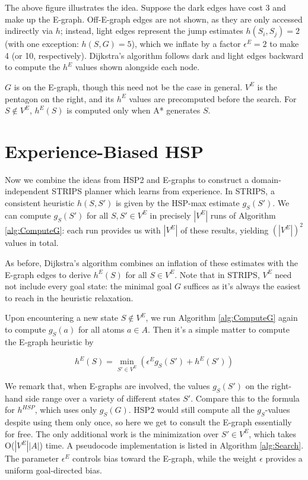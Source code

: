 \documentclass[letterpaper]{article}
\begin{document}
The above figure illustrates the idea. Suppose the dark edges have cost 3 and make up the E-graph. Off-E-graph edges are not shown, as they are only accessed indirectly via $h$; instead, light edges represent the jump estimates $h(S_i,S_j) = 2$ (with one exception: $h(S,G) = 5$), which we inflate by a factor $\epsilon^E=2$ to make 4 (or 10, respectively). Dijkstra's algorithm follows dark and light edges backward to compute the $h^E$ values shown alongside each node.

$G$ is on the E-graph, though this need not be the case in general. $V^E$ is the pentagon on the right, and its $h^E$ values are precomputed before the search. For $S\notin V^E$, $h^E(S)$ is computed only when A* generates $S$.

\section{Experience-Biased HSP}

Now we combine the ideas from HSP2 and E-graphs to construct a domain-independent STRIPS planner which learns from experience. In STRIPS, a consistent heuristic $h(S,S')$ is given by the HSP-max estimate $g_S(S')$. We can compute $g_S(S')$ for all $S,S'\in V^E$ in precisely $|V^E|$ runs of Algorithm \ref{alg:ComputeG}: each run provides us with $|V^E|$ of these results, yielding $(|V^E|)^2$ values in total.

As before, Dijkstra's algorithm combines an inflation of these estimates with the E-graph edges to derive $h^E(S)$ for all $S\in V^E$. Note that in STRIPS, $V^E$ need not include every goal state: the minimal goal $G$ suffices as it's always the easiest to reach in the heuristic relaxation.

Upon encountering a new state $S\notin V^E$, we run Algorithm \ref{alg:ComputeG} again to compute $g_S(a)$ for all atoms $a\in A$. Then it's a simple matter to compute the E-graph heuristic by

\[h^E(S) = \min_{S'\in V^E} \left( \epsilon^E g_S(S') + h^E(S') \right)\]

We remark that, when E-graphs are involved, the values $g_S(S')$ on the right-hand side range over a variety of different states $S'$. Compare this to the formula for $h^{HSP}$, which uses only $g_S(G)$. HSP2 would still compute all the $g_S$-values despite using them only once, so here we get to consult the E-graph essentially for free. The only additional work is the minimization over $S'\in V^E$, which takes O($|V^E||A|$) time. A pseudocode implementation is listed in Algorithm \ref{alg:Search}. The parameter $\epsilon^E$ controls bias toward the E-graph, while the weight $\epsilon$ provides a uniform goal-directed bias.
\end{document}
